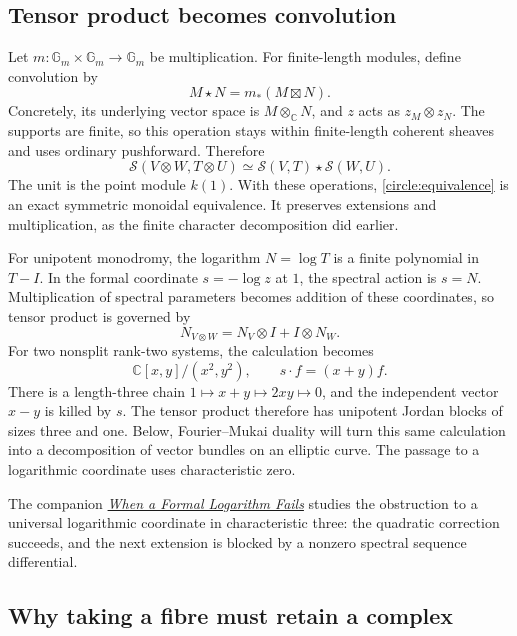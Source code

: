 \documentclass[11pt]{article}
\theoremstyle{remark}
\newcommand{\C}{\mathbb C}
\begin{document}
\subsection{Tensor product becomes convolution}

Let \(m:\mathbb G_m\times\mathbb G_m\to\mathbb G_m\) be multiplication. For finite-length modules, define convolution by
\[
M\star N=m_*(M\boxtimes N).
\]
Concretely, its underlying vector space is \(M\otimes_{\C}N\), and \(z\) acts as \(z_M\otimes z_N\). The supports are finite, so this operation stays within finite-length coherent sheaves and uses ordinary pushforward. Therefore
\begin{equation}
\mathcal S(V\otimes W,T\otimes U)
\simeq\mathcal S(V,T)\star\mathcal S(W,U).
\label{circle:convolution}
\end{equation}
The unit is the point module \(k(1)\). With these operations, \eqref{circle:equivalence} is an exact symmetric monoidal equivalence. It preserves extensions and multiplication, as the finite character decomposition did earlier.

For unipotent monodromy, the logarithm \(N=\log T\) is a finite polynomial in \(T-I\). In the formal coordinate \(s=-\log z\) at \(1\), the spectral action is \(s=N\). Multiplication of spectral parameters becomes addition of these coordinates, so tensor product is governed by
\[
N_{V\otimes W}=N_V\otimes I+I\otimes N_W.
\]
For two nonsplit rank-two systems, the calculation becomes
\[
\C[x,y]/(x^2,y^2),\qquad s\cdot f=(x+y)f.
\]
There is a length-three chain \(1\mapsto x+y\mapsto2xy\mapsto0\), and the independent vector \(x-y\) is killed by \(s\). The tensor product therefore has unipotent Jordan blocks of sizes three and one. Below, Fourier--Mukai duality will turn this same calculation into a decomposition of vector bundles on an elliptic curve. The passage to a logarithmic coordinate uses characteristic zero.

The companion \href{https://tensorgami.com/notes/when-a-formal-logarithm-fails.html}{\emph{When a Formal Logarithm Fails}} studies the obstruction to a universal logarithmic coordinate in characteristic three: the quadratic correction succeeds, and the next extension is blocked by a nonzero spectral sequence differential.

\subsection{Why taking a fibre must retain a complex}
\end{document}
